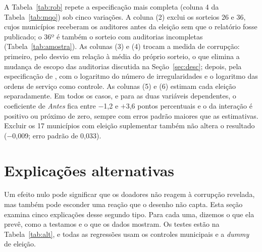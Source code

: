A Tabela~\ref{tab:rob} repete a especificação mais completa (coluna 4 da Tabela~\ref{tab:mqo}) sob cinco
variações. A coluna (2) exclui os sorteios 26 e 36, cujos municípios receberam os auditores antes da
eleição sem que o relatório fosse publicado; o 36º é também o sorteio com auditorias incompletas
(Tabela~\ref{tab:amostra}). As colunas (3) e (4) trocam a medida de corrupção: primeiro, pelo desvio em
relação à média do próprio sorteio, o que elimina a mudança de escopo das auditorias discutida na
Seção~\ref{sec:desc}; depois, pela especificação de , com o logaritmo do número de
irregularidades e o logaritmo das ordens de serviço como controle. As colunas (5) e (6) estimam cada
eleição separadamente. Em todos os casos, e para as duas variáveis dependentes, o coeficiente de
\textit{Antes} fica entre $-$1,2 e $+$3,6 pontos percentuais e o da interação é positivo ou próximo de
zero, sempre com erros padrão maiores que as estimativas. Excluir os 17 municípios com eleição suplementar
também não altera o resultado ($-$0,009; erro padrão de 0,033).


\FloatBarrier
\section{Explicações alternativas}\label{sec:alt}

Um efeito nulo pode significar que os doadores não reagem à corrupção revelada, mas também pode esconder
uma reação que o desenho não capta. Esta seção examina cinco explicações desse segundo tipo. Para cada uma,
dizemos o que ela prevê, como a testamos e o que os dados mostram. Os testes estão na
Tabela~\ref{tab:alt}, e todas as regressões usam os controles municipais e a \textit{dummy} de eleição.

\begin{table}[!htb]
\centering
\caption{Testes de explicações alternativas}\label{tab:alt}
\footnotesize\setlength{\tabcolsep}{3pt}

\end{table}

